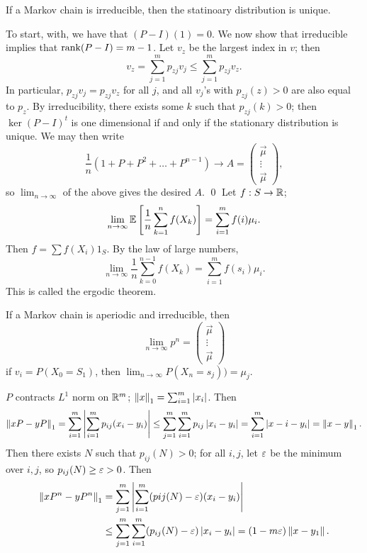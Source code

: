 \begin{simplelemma}
    If a Markov chain is irreducible, then the statinoary distribution is unique.
\end{simplelemma}
\noindent To start, with, we have that $(P - I)(1) = 0$. We now show that irreducible implies that $\operatorname{rank}(P - I) = m - 1$. Let $v_z$ be the largest index in $v$; then
\[ v_z = \sum_{j=1}^m p_{zj} v_j \leq \sum_{j=1}^m p_{zj} v_z. \]
In particular, $p_{zj} v_j = p_{zj} v_z$ for all $j$, and all $v_j$'s with $p_{zj}(z) > 0$ are also equal to $p_z$. By irreducibility, there exists some $k$ such that $p_{zj}(k) > 0$; then $\ker (P - I)^t$ is one dimensional if and only if the stationary distribution is unique. We may then write
\[ \frac{1}{n} \left(1 + P + P^2 + \dots + P^{n-1}\right) \to A = \begin{pmatrix} \vec{\mu} \\ \vdots \\ \vec{\mu} \end{pmatrix}, \]
so $\lim_{n \to \infty}$ of the above gives the desired $A$. \qed
\medskip\newline
Let $f : S \to \mathbb R$;
\[ \lim_{n \to \infty} \mathbb E \left[ \frac{1}{n} \sum_{k=1}^n f(X_k) \right] = \sum_{i=1}^m f(i) \mu_i. \]
Then $f = \sum f(X_i) 1_{S}$. By the law of large numbers,
\[ \lim_{n \to \infty} \frac{1}{n} \sum_{k=0}^{n-1} f(X_k) = \sum_{i=1}^m f(s_i) \mu_i. \]
This is called the ergodic theorem.
\begin{simplethm}
    If a Markov chain is aperiodic and irreducible, then
    \[ \lim_{n \to \infty} p^n = \begin{pmatrix} \vec{\mu} \\ \vdots \\ \vec{\mu} \end{pmatrix} \]
    if $v_i = P(X_0 = S_1)$, then $\lim_{n \to \infty} P(X_n = s_j)) = \mu_j$.
\end{simplethm}
\noindent $P$ contracts $L^1$ norm on $\mathbb R^m$; $\left\lVert x \right\rVert_1 = \sum_{i=1}^m \left\lvert x_i \right\rvert$. Then
\[ \left\lVert xP - yP \right\rVert_1 = \sum_{i=1}^m \left\lvert  \sum_{i=1}^m p_{ij}(x_i - y_i)  \right\rvert \leq \sum_{j=1}^m \sum_{i=1}^m p_{ij}\left\lvert x_i - y_i \right\rvert = \sum_{i=1}^m \left\lvert x-i - y_i \right\rvert = \left\lVert x - y \right\rVert_1. \]
Then there exists $N$ such that $p_{ij}(N) > 0$; for all $i, j$, let $\varepsilon$ be the minimum over $i, j$, so $p_{ij}(N) \geq \varepsilon > 0$. Then
\begin{align*}
    \left\lVert xP^n - yP^n \right\rVert_1 &= \sum_{j=1}^m \left\lvert \sum_{i=1}^m (p{ij}(N) - \varepsilon) (x_i - y_i)  \right\rvert \\
    & \leq \sum_{j=1}^m \sum_{i=1}^m (p_{ij}(N) - \varepsilon) \left\lvert x_i - y_i \right\rvert = (1 - m\varepsilon) \left\lVert x - y_1 \right\rVert.  
\end{align*}
